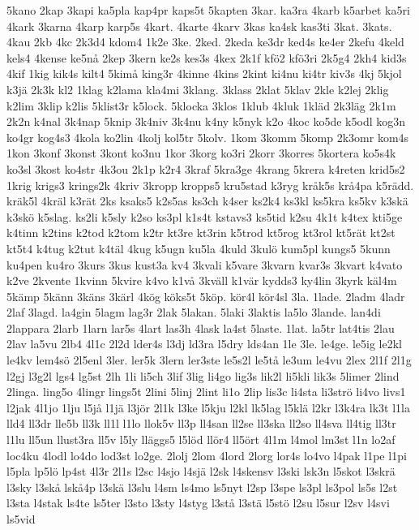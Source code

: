 {5kano
2kap
3kapi
ka5pla
kap4pr
kaps5t
5kapten
3kar.
ka3ra
4karb
k5arbet
ka5ri
4kark
3karna
4karp
karp5s
4kart.
4karte
4karv
3kas
ka4sk
kas3ti
3kat.
3kats.
4kau
2kb
4kc
2k3d4
kdom4
1k2e
3ke.
2ked.
2keda
ke3dr
ked4s
ke4er
2kefu
4keld
kels4
4kense
ke5nå
2kep
3kern
ke2s
kes3s
4kex
2k1f
kfö2
kfö3ri
2k5g4
2kh4
kid3s
4kif
1kig
kik4s
kilt4
5kimå
king3r
4kinne
4kins
2kint
ki4nu
ki4tr
kiv3s
4kj
5kjol
k3jä
2k3k
kl2
1klag
k2lama
kla4mi
3klang.
3klass
2klat
5klav
2kle
k2lej
2klig
k2lim
3klip
k2lis
5klist3r
k5lock.
5klocka
3klos
1klub
4kluk
1kläd
2k3läg
2k1m
2k2n
k4nal
3k4nap
5knip
3k4niv
3k4nu
k4ny
k5nyk
k2o
4koc
ko5de
k5odl
kog3n
ko4gr
kog4s3
4kola
ko2lin
4kolj
kol5tr
5kolv.
1kom
3komm
5komp
2k3omr
kom4s
1kon
3konf
3konst
3kont
ko3nu
1kor
3korg
ko3ri
2korr
3korres
5kortera
ko5s4k
ko3sl
3kost
ko4str
4k3ou
2k1p
k2r4
3kraf
5kra3ge
4krang
5krera
k4reten
krid5s2
1krig
krigs3
krings2k
4kriv
3kropp
kropps5
kru5stad
k3ryg
kråk5s
krå4pa
k5rädd.
kräk5l
4kräl
k3rät
2ks
ksaks5
k2s5as
ks3ch
k4ser
ks2k4
ks3kl
ks5kra
ks5kv
k3skä
k3skö
k5slag.
ks2li
k5sly
k2so
ks3pl
k1s4t
kstavs3
ks5tid
k2su
4k1t
k4tex
kti5ge
k4tinn
k2tins
k2tod
k2tom
k2tr
kt3re
kt3rin
k5trod
kt5rog
kt3rol
kt5rät
kt2st
kt5t4
k4tug
k2tut
k4täl
4kug
k5ugn
ku5la
4kuld
3kulö
kum5pl
kungs5
5kunn
ku4pen
ku4ro
3kurs
3kus
kust3a
kv4
3kvali
k5vare
3kvarn
kvar3s
3kvart
k4vato
k2ve
2kvente
1kvinn
5kvire
k4vo
k1vå
3kväll
k1vär
kydds3
ky4lin
3kyrk
käl4m
5kämp
5känn
3käns
3kärl
4kög
köks5t
5köp.
kör4l
kör4sl
3la.
1lade.
2ladm
4ladr
2laf
3lagd.
la4gin
5lagm
lag3r
2lak
5lakan.
5laki
3laktis
la5lo
3lande.
lan4di
2lappara
2larb
1larn
lar5s
4lart
las3h
4lask
la4st
5laste.
1lat.
la5tr
lat4tis
2lau
2lav
la5vu
2lb4
4l1c
2l2d
lder4s
l3dj
ld3ra
l5dry
lds4an
1le
3le.
le4ge.
le5ig
le2kl
le4kv
lem4sö
2l5enl
3ler.
ler5k
3lern
ler3ste
le5s2l
le5tå
le3um
le4vu
2lex
2l1f
2l1g
l2gj
l3g2l
lgs4
lg5st
2lh
1li
li5ch
3lif
3lig
li4go
lig3s
lik2l
li5kli
lik3s
5limer
2lind
2linga.
ling5o
4lingr
lings5t
2lini
5linj
2lint
li1o
2lip
lis3c
li4sta
li3strö
li4vo
livs1
l2jak
4l1jo
1lju
l5jå
l1jä
l3jör
2l1k
l3ke
l5kju
l2kl
lk5lag
l5klä
l2kr
l3k4ra
lk3t
l1la
lld4
ll3dr
lle5b
ll3k
ll1l
l1lo
llok5v
ll3p
ll4san
ll2se
ll3ska
ll2so
ll4sva
ll4tig
ll3tr
l1lu
ll5un
llust3ra
ll5v
l5ly
lläggs5
l5löd
llör4
ll5ört
4l1m
l4mol
lm3st
l1n
lo2af
loc4ku
4lodl
lo4do
lod3st
lo2ge.
2lolj
2lom
4lord
2lorg
lor4s
lo4vo
l4pak
l1pe
l1pi
l5pla
lp5lö
lp4st
4l3r
2l1s
l2sc
l4sjo
l4sjä
l2sk
l4skensv
l3ski
lsk3n
l5skot
l3skrä
l3sky
l3skå
lskå4p
l3skä
l3slu
l4sm
ls4mo
ls5nyt
l2sp
l3spe
ls3pl
ls3pol
ls5s
l2st
l3sta
l4stak
ls4te
ls5ter
l3sto
l3sty
l4styg
l3stå
l3stä
l5stö
l2su
l5sur
l2sv
l4svi
ls5vid
}

